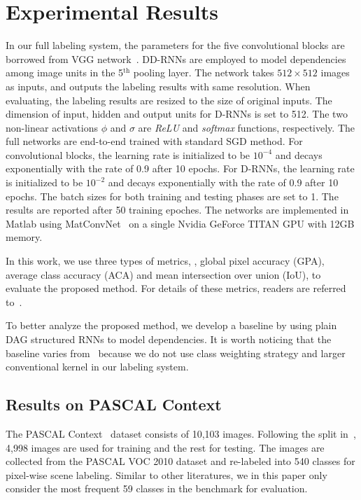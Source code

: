 \documentclass[10pt,twocolumn,letterpaper]{article}
\begin{document}
\section{Experimental Results}
\label{sec_res}

 In our full labeling system, the parameters for the five convolutional blocks are borrowed from VGG network~\cite{simonyan2014very}. DD-RNNs are employed to model dependencies among image units in the 5$^{\mathrm{th}}$ pooling layer. The network takes $512\times{512}$ images as inputs, and outputs the labeling results with same resolution. When evaluating, the labeling results are resized to the size of original inputs. The dimension of input, hidden and output units for D-RNNs is set to 512. The two non-linear activations $\phi$ and $\sigma$ are {\it ReLU} and {\it softmax} functions, respectively. The full networks are end-to-end trained with standard SGD method. For convolutional blocks, the learning rate is initialized to be $10^{-4}$
and decays exponentially with the rate of 0.9 after 10 epochs. For D-RNNs, the learning rate is initialized to be $10^{-2}$ and decays exponentially with the rate of 0.9 after 10 epochs. The batch sizes for both training and testing phases are set to 1. The results are reported after 50 training epoches. The networks are implemented in Matlab using MatConvNet~\cite{vedaldi2015matconvnet} on a single Nvidia GeForce TITAN GPU with 12GB memory.

 In this work, we use three types of metrics, \ie, global pixel accuracy (GPA), average class accuracy (ACA) and mean intersection over union (IoU), to evaluate the proposed method. For details of these metrics, readers are referred to~\cite{long2015fully}.

 To better analyze the proposed method, we develop a baseline by using plain DAG structured RNNs to model dependencies. It is worth noticing that the baseline varies from~\cite{shuai2017scene} because we do not use class weighting strategy and larger conventional kernel in our labeling system.

\subsection{Results on PASCAL Context}

The PASCAL Context~\cite{mottaghi2014role} dataset consists of 10,103 images. Following the split in~\cite{mottaghi2014role}, 4,998 images are used for training and the rest for testing. The images are collected from the PASCAL VOC 2010 dataset and re-labeled into 540 classes for pixel-wise scene labeling. Similar to other literatures, we in this paper only consider the most frequent 59 classes in the benchmark for evaluation.
\end{document}
